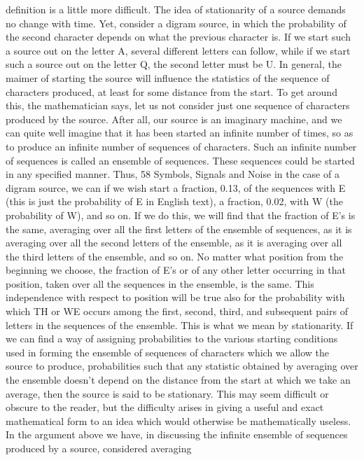 definition is a little more difficult.
The idea of stationarity of a source demands no change with
time. Yet, consider a digram source, in which the probability of
the second character depends on what the previous character is.
If we start such a source out on the letter A, several different
letters can follow, while if we start such a source out on the letter
Q, the second letter must be U. In general, the maimer of starting
the source will influence the statistics of the sequence of characters
produced, at least for some distance from the start.
To get around this, the mathematician says, let us not consider
just one sequence of characters produced by the source. After all,
our source is an imaginary machine, and we can quite well imagine
that it has been started an infinite number of times, so as to produce
an infinite number of sequences of characters. Such an infinite
number of sequences is called an ensemble of sequences.
These sequences could be started in any specified manner. Thus,
58
Symbols, Signals and Noise
in the case of a digram source, we can if we wish start a fraction,
0.13, of the sequences with E (this is just the probability of E in
English text), a fraction, 0.02, with W (the probability of W), and
so on. If we do this, we will find that the fraction of E’s is the same,
averaging over all the first letters of the ensemble of sequences, as
it is averaging over all the second letters of the ensemble, as it is
averaging over all the third letters of the ensemble, and so on. No
matter what position from the beginning we choose, the fraction
of E’s or of any other letter occurring in that position, taken over
all the sequences in the ensemble, is the same. This independence
with respect to position will be true also for the probability with
which TH or WE occurs among the first, second, third, and subsequent
pairs of letters in the sequences of the ensemble.
This is what we mean by stationarity. If we can find a way of
assigning probabilities to the various starting conditions used in
forming the ensemble of sequences of characters which we allow
the source to produce, probabilities such that any statistic obtained
by averaging over the ensemble doesn’t depend on the distance
from the start at which we take an average, then the source is said
to be stationary. This may seem difficult or obscure to the reader,
but the difficulty arises in giving a useful and exact mathematical
form to an idea which would otherwise be mathematically useless.
In the argument above we have, in discussing the infinite ensemble
of sequences produced by a source, considered averaging
